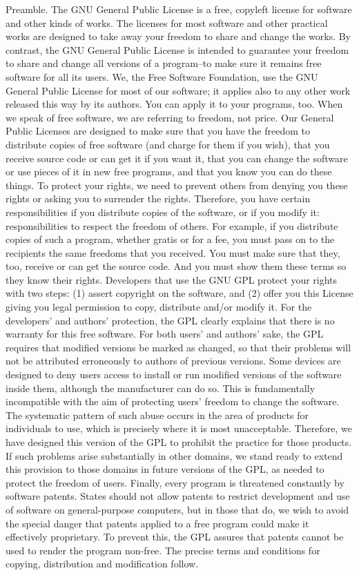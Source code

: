 \documentclass {book}
\begin{document}
\begin{tiny}
Preamble. The GNU General Public License is a free, copyleft license for software and other kinds of works. The licenses for most software and other practical works are designed to take away your freedom to share and change the works. By contrast, the GNU General Public License is intended to guarantee your freedom to share and change all versions of a program--to make sure it remains free software for all its users. We, the Free Software Foundation, use the GNU General Public License for most of our software; it applies also to any other work released this way by its authors. You can apply it to your programs, too. When we speak of free software, we are referring to freedom, not price. Our General Public Licenses are designed to make sure that you have the freedom to distribute copies of free software (and charge for them if you wish), that you receive source code or can get it if you want it, that you can change the software or use pieces of it in new free programs, and that you know you can do these things. To protect your rights, we need to prevent others from denying you these rights or asking you to surrender the rights. Therefore, you have certain responsibilities if you distribute copies of the software, or if you modify it: responsibilities to respect the freedom of others. For example, if you distribute copies of such a program, whether gratis or for a fee, you must pass on to the recipients the same freedoms that you received. You must make sure that they, too, receive or can get the source code. And you must show them these terms so they know their rights. Developers that use the GNU GPL protect your rights with two steps: (1) assert copyright on the software, and (2) offer you this License giving you legal permission to copy, distribute and/or modify it. For the developers' and authors' protection, the GPL clearly explains that there is no warranty for this free software. For both users' and authors' sake, the GPL requires that modified versions be marked as changed, so that their problems will not be attributed erroneously to authors of previous versions. Some devices are designed to deny users access to install or run modified versions of the software inside them, although the manufacturer can do so. This is fundamentally incompatible with the aim of protecting users' freedom to change the software. The systematic pattern of such abuse occurs in the area of products for individuals to use, which is precisely where it is most unacceptable. Therefore, we have designed this version of the GPL to prohibit the practice for those products. If such problems arise substantially in other domains, we stand ready to extend this provision to those domains in future versions of the GPL, as needed to protect the freedom of users. Finally, every program is threatened constantly by software patents. States should not allow patents to restrict development and use of software on general-purpose computers, but in those that do, we wish to avoid the special danger that patents applied to a free program could make it effectively proprietary. To prevent this, the GPL assures that patents cannot be used to render the program non-free. The precise terms and conditions for copying, distribution and modification follow.


\end{tiny}
\end{document}
